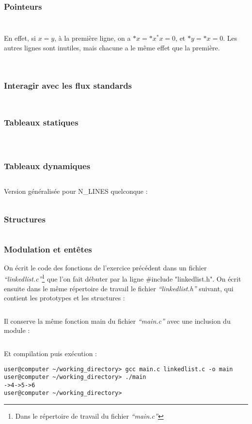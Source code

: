 \documentclass[../main.tex]{subfiles}
\begin{document}
\subsubsection{Pointeurs}
\inputminted{c}{solutions/become_bot.c}
\inputminted{c}{solutions/inter_no_side_effect_3.c}
En effet, si $x = y$, à la première ligne, on a $*x = *x ^ *x = 0$, et $*y = *x = 0$. Les autres lignes sont inutiles, mais chacune a le même effet que la première.
\\ \\ 
\inputminted{c}{solutions/manhattan_dist.c}
\subsubsection{Interagir avec les flux standards}
\inputminted{c}{solutions/euclidian_dist.c}
\inputminted{c}{solutions/int_sum.c}
\subsubsection{Tableaux statiques}
\inputminted{c}{solutions/tab_display.c}
\inputminted{c}{solutions/tab_sum.c}
\inputminted{c}{solutions/tab_max_min.c}
\subsubsection{Tableaux dynamiques}
\inputminted{c}{solutions/tab_display_2d.c}
\newline
Version généralisée pour \textsf{N\_LINES} quelconque : 
\inputminted{c}{solutions/triangle.c}
\subsubsection{Structures}
\inputminted{c}{solutions/linkedlist_1.c}
\subsubsection{Modulation et entêtes}
 \newline
On écrit le code des fonctions de l'exercice précédent dans un fichier \textit{``linkedlist.c''}\footnote{Dans le répertoire de travail du fichier \textit{``main.c''}} que l'on fait débuter par la ligne \textsf{\#include "linkedlist.h"}. On écrit ensuite dans le même répertoire de travail le fichier \textit{``linkedlist.h''} suivant, qui contient les prototypes et les structures :
\inputminted{c}{solutions/linkedlist_2.h}
Il conserve la même fonction \textsf{main} du fichier \textit{``main.c''} avec une inclusion du module :
\inputminted{c}{solutions/linkedlist_2.c}
Et compilation puis exécution :
\begin{verbatim}
user@computer ~/working_directory> gcc main.c linkedlist.c -o main
user@computer ~/working_directory> ./main
->4->5->6
user@computer ~/working_directory>
\end{verbatim}
\end{document}
